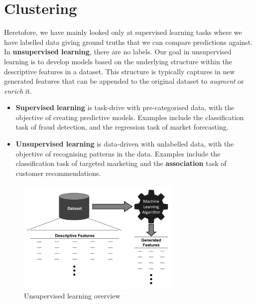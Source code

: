 \documentclass[a4paper,11pt]{article}
\begin{document}
\section{Clustering}
Heretofore, we have mainly looked only at supervised learning tasks where we have labelled data giving ground truths that we can compare predictions against.
In \textbf{unsupervised learning}, there are no labels.
Our goal in unsupervised learning is to develop models based on the underlying structure within the descriptive features in a dataset.
This structure is typically captures in new generated features that can be appended to the original dataset to \textit{augment} or \textit{enrich} it.
\begin{itemize}
    \item   \textbf{Supervised learning} is task-drive with pre-categorised data, with the objective of creating predictive models.
            Examples include the classification task of fraud detection, and the regression task of market forecasting.
    \item   \textbf{Unsupervised learning} is data-driven with unlabelled data, with the objective of recognising patterns in the data.
            Examples include the classification task of targeted marketing and the \textbf{association} task of customer recommendations.
\end{itemize}

\begin{figure}[H]
    \centering
    \includegraphics[width=0.7\textwidth]{images/unsupervisedoverview.png}
    \caption{ Unsupervised learning overview }
\end{figure}
\end{document}
